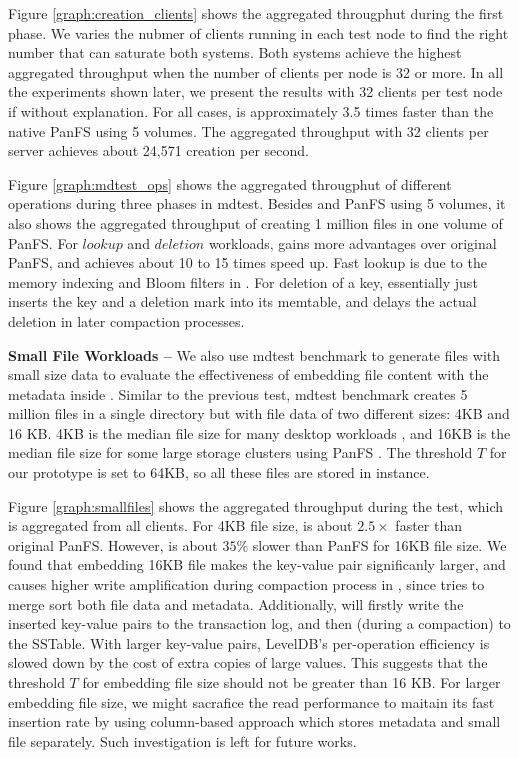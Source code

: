 Figure \ref{graph:creation_clients} shows the aggregated througphut during
the first phase. We varies the nubmer of clients running in each test node
to find the right number that can saturate both systems.
Both systems achieve the highest aggregated throughput when the number
of clients per node is 32 or more. In all the experiments shown later,
we present the results with 32 clients per test node if without explanation.
For all cases, \sys  is approximately 3.5 times faster than the native PanFS
using 5 volumes. The aggregated throughput with 32 clients per server
achieves about 24,571 creation per second.

Figure \ref{graph:mdtest_ops} shows the aggregated througphut of
different operations during three phases in mdtest.
Besides \sys and PanFS using 5 volumes, it also shows
the aggregated throughput of creating 1 million files in one volume of PanFS.
For $lookup$ and $deletion$ workloads,
\sys gains more advantages over original PanFS,
and achieves about 10 to 15 times speed up.
Fast lookup is due to the memory indexing and Bloom filters in \ldb.
For deletion of a key, \ldb essentially just inserts the key and a deletion mark
into its memtable, and delays the actual deletion in later compaction processes.


\textbf{Small File Workloads -- }
We also use mdtest benchmark to generate files with small size data to evaluate
the effectiveness of embedding file content with the metadata inside \tfs.
Similar to the previous test,
mdtest benchmark creates 5 million files in a single directory
but with file data of two different sizes: 4KB and 16 KB.
4KB is the median file size for many desktop workloads \cite{Bill11},
and 16KB is the median file size for some large storage clusters using PanFS \cite{brent13}.
The threshold $T$ for our prototype is set to 64KB, so all these files
are stored in \tfs instance.

Figure \ref{graph:smallfiles} shows the aggregated throughput during the test,
which is aggregated from all clients. For 4KB file size,
\sys is about $2.5\times$ faster than original PanFS.
However, \sys is about $35\%$ slower than PanFS for 16KB file size.
We found that embedding 16KB file makes the key-value pair significanly larger,
and causes higher write amplification during compaction process in \ldb,
since \ldb tries to merge sort both file data and metadata.
Additionally, \ldb will firstly write the inserted key-value pairs
to the transaction log, and then (during a compaction) to the SSTable.
With larger key-value pairs, LevelDB's per-operation efficiency is
slowed down by the cost of extra copies of large values.
This suggests that the threshold $T$ for embedding file size should not be
greater than 16 KB. For larger embedding file size,
we might sacrafice the read performance to maitain its fast insertion rate
by using column-based approach which stores metadata and small file separately.
Such investigation is left for future works.

